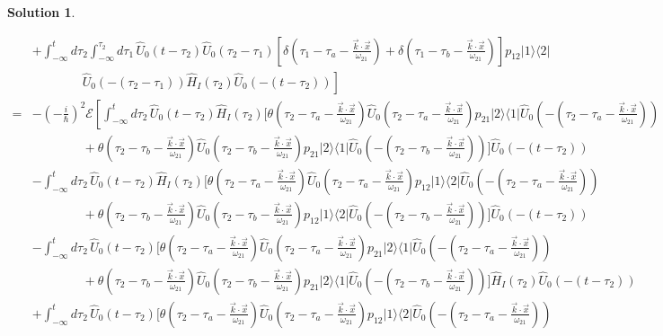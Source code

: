 \documentclass[UTF8,10pt,a4paper]{article}
\theoremstyle{Problem}
\theoremstyle{Solution}
\newtheorem*{sol}{Solution}
\begin{document}
\begin{sol}
\begin{enumerate}
\begin{align}
            \nonumber&+\int_{-\infty}^td\tau_2\int_{-\infty}^{\tau_2}d\tau_1\,\hat{U}_0(t-\tau_2)\hat{U}_0(\tau_2-\tau_1)[\delta(\tau_1-\tau_a-\frac{\vec{k}\cdot\vec{x}}{\omega_{21}})+\delta(\tau_1-\tau_b-\frac{\vec{k}\cdot\vec{x}}{\omega_{21}})]p_{12}\lvert 1\rangle\langle 2\rvert\\
            \nonumber&\left.\qquad\qquad\hat{U}_0(-(\tau_2-\tau_1))\hat{H}_I(\tau_2)\hat{U}_0(-(t-\tau_2))\right]\\
            \nonumber=&-\left(-\frac{i}{\hbar}\right)^2\mathscr{E}\left[\int_{-\infty}^td\tau_2\,\hat{U}_0(t-\tau_2)\hat{H}_I(\tau_2)[\theta(\tau_2-\tau_a-\frac{\vec{k}\cdot\vec{x}}{\omega_{21}})\hat{U}_0(\tau_2-\tau_a-\frac{\vec{k}\cdot\vec{x}}{\omega_{21}})p_{21}\lvert 2\rangle\langle 1\rvert\hat{U}_0(-(\tau_2-\tau_a-\frac{\vec{k}\cdot\vec{x}}{\omega_{21}}))\right.\\
            \nonumber&\qquad\qquad+\theta(\tau_2-\tau_b-\frac{\vec{k}\cdot\vec{x}}{\omega_{21}})\hat{U}_0(\tau_2-\tau_b-\frac{\vec{k}\cdot\vec{x}}{\omega_{21}})p_{21}\lvert 2\rangle\langle 1\rvert\hat{U}_0(-(\tau_2-\tau_b-\frac{\vec{k}\cdot\vec{x}}{\omega_{21}}))]\hat{U}_0(-(t-\tau_2))\\
            \nonumber&-\int_{-\infty}^td\tau_2\,\hat{U}_0(t-\tau_2)\hat{H}_I(\tau_2)[\theta(\tau_2-\tau_a-\frac{\vec{k}\cdot\vec{x}}{\omega_{21}})\hat{U}_0(\tau_2-\tau_a-\frac{\vec{k}\cdot\vec{x}}{\omega_{21}})p_{12}\lvert 1\rangle\langle 2\rvert\hat{U}_0(-(\tau_2-\tau_a-\frac{\vec{k}\cdot\vec{x}}{\omega_{21}}))\\
            \nonumber&\qquad\qquad+\theta(\tau_2-\tau_b-\frac{\vec{k}\cdot\vec{x}}{\omega_{21}})\hat{U}_0(\tau_2-\tau_b-\frac{\vec{k}\cdot\vec{x}}{\omega_{21}})p_{12}\lvert 1\rangle\langle 2\rvert\hat{U}_0(-(\tau_2-\tau_b-\frac{\vec{k}\cdot\vec{x}}{\omega_{21}}))]\hat{U}_0(-(t-\tau_2))\\
            \nonumber&-\int_{-\infty}^td\tau_2\,\hat{U}_0(t-\tau_2)[\theta(\tau_2-\tau_a-\frac{\vec{k}\cdot\vec{x}}{\omega_{21}})\hat{U}_0(\tau_2-\tau_a-\frac{\vec{k}\cdot\vec{x}}{\omega_{21}})p_{21}\lvert 2\rangle\langle 1\rvert\hat{U}_0(-(\tau_2-\tau_a-\frac{\vec{k}\cdot\vec{x}}{\omega_{21}}))\\
            \nonumber&\qquad\qquad+\theta(\tau_2-\tau_b-\frac{\vec{k}\cdot\vec{x}}{\omega_{21}})\hat{U}_0(\tau_2-\tau_b-\frac{\vec{k}\cdot\vec{x}}{\omega_{21}})p_{21}\lvert 2\rangle\langle 1\rvert\hat{U}_0(-(\tau_2-\tau_b-\frac{\vec{k}\cdot\vec{x}}{\omega_{21}}))]\hat{H}_I(\tau_2)\hat{U}_0(-(t-\tau_2))\\
            \nonumber&+\int_{-\infty}^td\tau_2\,\hat{U}_0(t-\tau_2)[\theta(\tau_2-\tau_a-\frac{\vec{k}\cdot\vec{x}}{\omega_{21}})\hat{U}_0(\tau_2-\tau_a-\frac{\vec{k}\cdot\vec{x}}{\omega_{21}})p_{12}\lvert 1\rangle\langle 2\rvert\hat{U}_0(-(\tau_2-\tau_a-\frac{\vec{k}\cdot\vec{x}}{\omega_{21}}))\\

\end{align}
\end{enumerate}
\end{sol}
\end{document}
